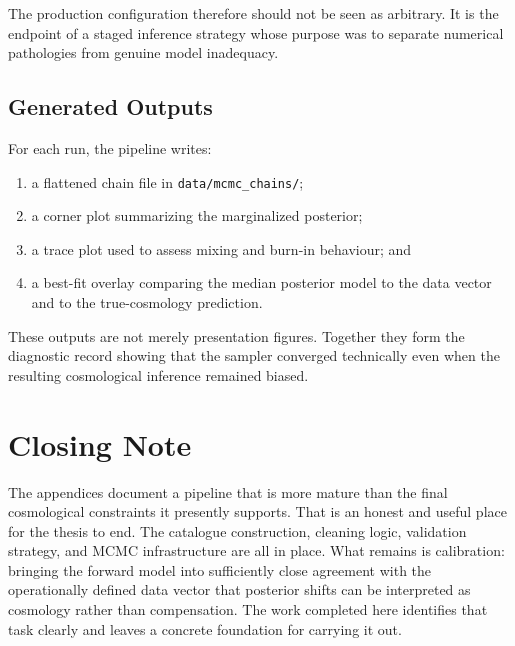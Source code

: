 \documentclass[12pt]{report}
\begin{document}
The production configuration therefore should not be seen as arbitrary. It is the endpoint of a staged inference strategy whose purpose was to separate numerical pathologies from genuine model inadequacy.

\section{Generated Outputs}

For each run, the pipeline writes:
\begin{enumerate}
    \item a flattened chain file in \texttt{data/mcmc\_chains/};
    \item a corner plot summarizing the marginalized posterior;
    \item a trace plot used to assess mixing and burn-in behaviour; and
    \item a best-fit overlay comparing the median posterior model to the data vector and to the true-cosmology prediction.
\end{enumerate}

These outputs are not merely presentation figures. Together they form the diagnostic record showing that the sampler converged technically even when the resulting cosmological inference remained biased.

\chapter*{Closing Note}

The appendices document a pipeline that is more mature than the final cosmological constraints it presently supports. That is an honest and useful place for the thesis to end. The catalogue construction, cleaning logic, validation strategy, and MCMC infrastructure are all in place. What remains is calibration: bringing the forward model into sufficiently close agreement with the operationally defined data vector that posterior shifts can be interpreted as cosmology rather than compensation. The work completed here identifies that task clearly and leaves a concrete foundation for carrying it out.




\end{document}
